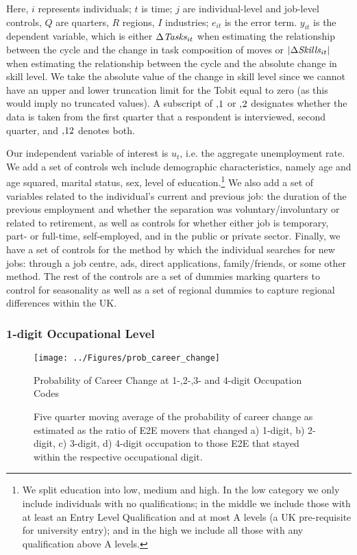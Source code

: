 \documentclass[preprint,12pt,authoryear]{elsarticle}
\begin{document}
\noindent Here, $i$ represents individuals; $t$ is time; $j$ are individual-level and job-level controls, $Q$ are quarters, $R$ regions, $I$ industries; $e_{it}$ is the error term. $y_{it}$ is the dependent variable, which is either $\Delta\text{\textit{Tasks}}_{it}$ when estimating the relationship between the cycle and the change in task composition of moves or $|\Delta\text{\textit{Skills}}_{it}|$ when estimating the relationship between the cycle and the absolute change in skill level. We take the absolute value of the change in skill level since we cannot have an upper and lower truncation limit for the Tobit equal to zero (as this would imply no truncated values). A subscript of $,\hspace{-0.5mm}1$ or $,\hspace{-0.5mm}2$ designates whether the data is taken from the first quarter that a respondent is interviewed, second quarter, and $,\hspace{-0.5mm}12$ denotes both.

\vspace{2mm}

Our independent variable of interest is $u_{t}$, i.e. the aggregate unemployment rate. We add a set of controls wch include demographic characteristics, namely age and age squared, marital status, sex, level of education.\footnote{We split education into low, medium and high. In the low category we only include individuals with no qualifications; in the middle we include those with at least an Entry Level Qualification and at most A levels (a UK pre-requisite for university entry); and in the high we include all those with any qualification above A levels.} We also add a set of variables related to the individual's current and previous job: the duration of the previous employment and whether the separation was voluntary/involuntary or related to retirement, as well as controls for whether either job is temporary, part- or full-time, self-employed, and in the public or private sector. Finally, we have a set of controls for the method by which the individual searches for new jobs: through a job centre, ads, direct applications, family/friends, or some other method. The rest of the controls are a set of dummies marking quarters to control for seasonality as well as a set of regional dummies to capture regional differences within the UK.

\subsubsection{1-digit Occupational Level}
\label{sec:1digit}
\begin{figure}[h!]
	\centering
	\texttt{[image: ../Figures/prob\_career\_change]}
	\caption{Probability of Career Change at 1-,2-,3- and 4-digit Occupation Codes}
	\caption*{\footnotesize{Five quarter moving average of the probability of career change as estimated as the ratio of E2E movers that changed a) 1-digit, b) 2-digit, c) 3-digit, d) 4-digit occupation to those E2E that stayed within the respective occupational digit.}}
	\label{fig:probCareerChange}
\end{figure}
\end{document}
